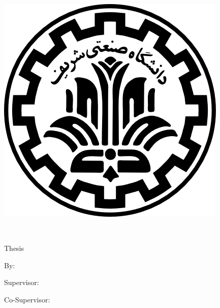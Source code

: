 
\pagestyle{empty}

\begin{center}

\begin{latin}

\includegraphics[scale=0.2]{front/template/images/logo.png}

\EnglishThesisUniversity \\
\EnglishThesisDepartment

\begin{large}
\vspace{0.7cm}
\EnglishThesisDegree{} Thesis


\vspace{1.5cm}

{\Large\textbf\EnglishThesisTitle}

\vspace{1.5cm}

{\normalsize By:}\\
\textbf{\EnglishThesisAuthor}

\vspace{1cm}

{\normalsize Supervisor:}\\ 
\textbf{\EnglishThesisSupervisor}

\vspace{1cm}

{\normalsize Co-Supervisor:}\\ 
\textbf{\EnglishThesisCoSupervisor}

\end{large}

\vspace{1.5cm}
\EnglishThesisDate

\end{latin}

\end{center}
